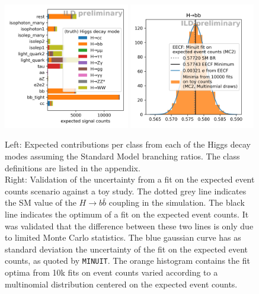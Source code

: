 \documentclass[11pt, hidelinks, a4paper]{scrartcl}
\begin{document}
\begin{figure}[ht]
    \centering
    \includegraphics[width=0.49\textwidth, keepaspectratio]{intro_category_counts}
    \includegraphics[width=0.49\textwidth, keepaspectratio]{H_bb}
    \caption{
        Left: Expected contributions per class from each of the Higgs decay modes
        assuming the Standard Model branching ratios.
        The class definitions are listed in the appendix.
        \\
        Right: Validation of the uncertainty from
        a fit on the expected event counts scenario against a toy study.
        The dotted grey line indicates the SM value of
        the $H \to b \bar{b}$ coupling in the simulation.
        The black line indicates the optimum of a fit on
        the expected event counts.
        It was validated that the difference between these two lines
        is only due to limited Monte Carlo statistics.
        The blue gaussian curve has as standard deviation the uncertainty of
        the fit on the expected event counts, as quoted by \texttt{MINUIT}.
        The orange histogram contains the fit optima from
        10k fits on event counts varied according to
        a multinomial distribution centered on the expected event counts.
    }\label{fig:toys}
\end{figure}
\end{document}
